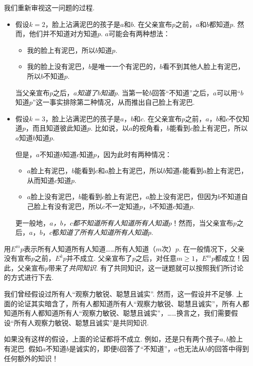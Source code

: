 我们重新审视这一问题的过程. 
\begin{itemize}
    \item 
    假设$k=2$，脸上沾满泥巴的孩子是$a$和$b$. 在父亲宣布$p$之前，$a$和$b$都知道$p$. 然而，他们并不知道对方知道$p$. $a$可能会有两种想法：
        \begin{itemize}
            \item 我的脸上有泥巴，所以$b$知道$p$.
            \item 我的脸上没有泥巴，$b$是唯一一个有泥巴的，$b$看不到其他人脸上有泥巴，所以$b$不知道$p$.
        \end{itemize}
    当父亲宣布$p$之后，\emph{$a$知道了$b$知道$p$}. 当第一轮$b$回答“不知道”之后，$a$可以用“$b$知道$p$”这一事实排除第二种情况，从而推出自己脸上有泥巴.    
    \item 假设$k=3$，脸上沾满泥巴的孩子是$a$，$b$和$c$. 在父亲宣布$p$之前，$a$，$b$和$c$不仅知道$p$，而且知道彼此知道$p$. 比如说，以$a$的视角看，$b$能看到$c$脸上有泥巴，所以$a$知道$b$知道$p$. 
    
    但是，$a$不知道$b$知道$c$知道$p$，因为此时有两种情况：
    \begin{itemize}
        \item $a$脸上有泥巴，$b$能看到$c$和$a$脸上有泥巴，所以$b$知道$c$能看到$a$脸上有泥巴，从而知道$c$知道$p$.
        \item $a$脸上没有泥巴，$b$能看到$c$脸上有泥巴，$a$脸上没有泥巴，但因为$b$不知道自己脸上有没有泥巴，所以$c$不一定知道$p$，$b$不知道$c$知道$p$.
    \end{itemize}
    更一般地，\emph{$a$，$b$，$c$都不知道所有人知道所有人知道$p$}！然而，当父亲宣布$p$之后，$a$，$b$，$c$都\emph{知道了所有人知道所有人知道$p$}.
\end{itemize}

用$E^m p$表示所有人知道所有人知道……所有人知道（$m$次）$p$. 在一般情况下，父亲没有宣布$p$之前，$E^k p$并不成立. 父亲宣布了$p$之后，对任意$m\geq 1$，$E^m p$都成立！因此，父亲宣布$p$带来了\emph{共同知识}. 有了共同知识，这一谜题就可以按照我们所讨论的方式进行下去.

我们曾经假设过所有人“观察力敏锐、聪慧且诚实”. 然而，这一假设并不足够. 上面的论证其实暗含了，所有人都知道所有人“观察力敏锐、聪慧且诚实”，所有人都知道所有人都知道所有人“观察力敏锐、聪慧且诚实”，……换言之，我们需要假设“所有人观察力敏锐、聪慧且诚实”是共同知识. 

如果没有这样的假设，上面的论证都将不成立. 例如，还是只有两个孩子$a,b$脸上有泥巴. 假如$a$不知道$b$是诚实的，即便$b$回答了“不知道”，$a$也无法从$b$的回答中得到任何额外的知识！

